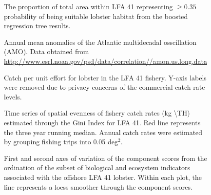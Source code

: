 \documentclass[11pt]{article}
\newcommand{\D}{.}
\newcommand{\e}{/backup/bio_data/bio.lobster/figures/} %
\begin{document}
\begin{figure}

    \caption{The proportion of total area within LFA 41 representing $\geq 0.35$ probability of being suitable lobster habitat from the boosted regression tree results. }

\end{figure}


\begin{figure}

    \caption{Annual mean anomalies of the Atlantic multidecadal osscillation (AMO). Data obtained from \url{http://www.esrl.noaa.gov/psd/data/correlation//amon.us.long.data}}

\end{figure}

\begin{figure}

    \caption{Catch per unit effort for lobster in the LFA 41 fishery. Y-axis labels were removed due to privacy concerns of the commercial catch rate levels.}

\end{figure}

\begin{figure}

    \caption{Time series of spatial evenness of fishery catch rates (kg \textbackslash TH) estimated through the Gini Index for LFA 41. Red line represents the three year running median. Annual catch rates were estimated by grouping fishing trips into 0.05 deg$^2$.}

\end{figure}

\clearpage

\begin{figure}

    
    \caption{First and second axes of variation of the component scores from the ordination of the subset of biological and ecosystem indicators associated with the offshore LFA 41 lobster. Within each plot, the line represents a loess smoother through the component scores.}

\end{figure}
\clearpage
\end{document}
